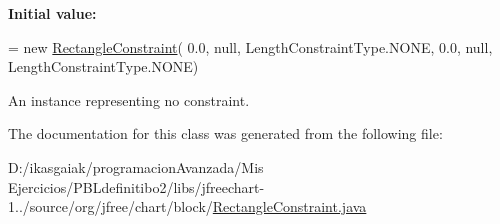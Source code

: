 {\bfseries Initial value\+:}
\begin{DoxyCode}
= \textcolor{keyword}{new} \mbox{\hyperlink{classorg_1_1jfree_1_1chart_1_1block_1_1_rectangle_constraint_af72e3b34ff39c2e1cb2873a41622bada}{RectangleConstraint}}(
            0.0, null, LengthConstraintType.NONE,
            0.0, null, LengthConstraintType.NONE)
\end{DoxyCode}
An instance representing no constraint. 

The documentation for this class was generated from the following file\+:\begin{DoxyCompactItemize}
\item 
D\+:/ikasgaiak/programacion\+Avanzada/\+Mis Ejercicios/\+P\+B\+Ldefinitibo2/libs/jfreechart-\/1../source/org/jfree/chart/block/\mbox{\hyperlink{_rectangle_constraint_8java}{Rectangle\+Constraint.\+java}}\end{DoxyCompactItemize}
